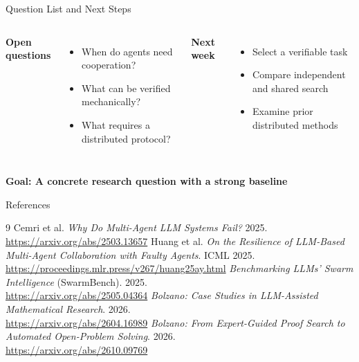 \documentclass[aspectratio=169,10pt]{beamer}
\begin{document}
\begin{frame}{Question List and Next Steps}
\begin{columns}[T,onlytextwidth]
\textbf{Open questions}
\begin{itemize}\setlength{\itemsep}{3mm}
\item When do agents need cooperation?
\item What can be verified mechanically?
\item What requires a distributed protocol?
\end{itemize}
\textbf{Next week}
\begin{itemize}\setlength{\itemsep}{3mm}
\item Select a verifiable task
\item Compare independent and shared search
\item Examine prior distributed methods
\end{itemize}
\end{columns}
\vspace{7mm}
\begin{center}\large\bfseries Goal: A concrete research question with a strong baseline\end{center}
\end{frame}

\begin{frame}{References}
\scriptsize
\begin{thebibliography}{9}
 Cemri et al. \emph{Why Do Multi-Agent LLM Systems Fail?} 2025.\\\url{https://arxiv.org/abs/2503.13657}
 Huang et al. \emph{On the Resilience of LLM-Based Multi-Agent Collaboration with Faulty Agents}. ICML 2025.\\\url{https://proceedings.mlr.press/v267/huang25ay.html}
 \emph{Benchmarking LLMs' Swarm Intelligence} (SwarmBench). 2025.\\\url{https://arxiv.org/abs/2505.04364}
 \emph{Bolzano: Case Studies in LLM-Assisted Mathematical Research}. 2026.\\\url{https://arxiv.org/abs/2604.16989}
 \emph{Bolzano: From Expert-Guided Proof Search to Automated Open-Problem Solving}. 2026.\\\url{https://arxiv.org/abs/2610.09769}
\end{thebibliography}
\end{frame}
\end{document}
